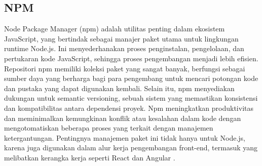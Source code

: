 \subsection{NPM}
Node Package Manager (npm) adalah utilitas penting dalam ekosistem JavaScript, yang bertindak sebagai manajer paket utama untuk lingkungan runtime Node.js. Ini menyederhanakan proses penginstalan, pengelolaan, dan pertukaran kode JavaScript, sehingga proses pengembangan menjadi lebih efisien. Repositori npm memiliki koleksi paket yang sangat banyak, berfungsi sebagai sumber daya yang berharga bagi para pengembang untuk mencari potongan kode dan pustaka yang dapat digunakan kembali. Selain itu, npm menyediakan dukungan untuk semantic versioning, sebuah sistem yang memastikan konsistensi dan kompatibilitas antara dependensi proyek. Npm meningkatkan produktivitas dan meminimalkan kemungkinan konflik atau kesalahan dalam kode dengan mengotomatiskan beberapa proses yang terkait dengan manajemen ketergantungan. Pentingnya manajemen paket ini tidak hanya untuk Node.js, karena juga digunakan dalam alur kerja pengembangan front-end, termasuk yang melibatkan kerangka kerja seperti React dan Angular \citep{nodejs2025npm}.
